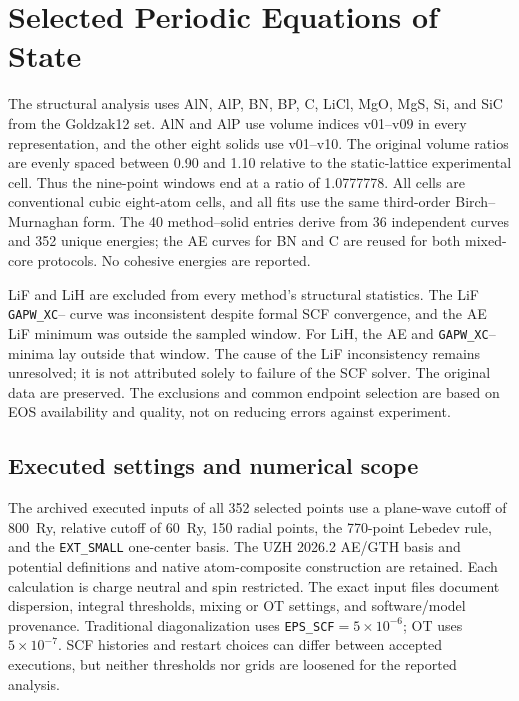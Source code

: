 \section{Selected Periodic Equations of State}

The structural analysis uses AlN, AlP, BN, BP, C, LiCl, MgO, MgS, Si, and SiC from the Goldzak12 set.\cite{Goldzak2022Solids} AlN and AlP use volume indices v01--v09 in every representation, and the other eight solids use v01--v10. The original volume ratios are evenly spaced between 0.90 and 1.10 relative to the static-lattice experimental cell. Thus the nine-point windows end at a ratio of 1.0777778. All cells are conventional cubic eight-atom cells, and all fits use the same third-order Birch--Murnaghan form. The 40 method--solid entries derive from 36 independent curves and 352 unique energies; the AE curves for BN and C are reused for both mixed-core protocols. No cohesive energies are reported.

LiF and LiH are excluded from every method's structural statistics. The LiF \texttt{GAPW\_XC}--\GTH{} curve was inconsistent despite formal SCF convergence, and the AE LiF minimum was outside the sampled window. For LiH, the AE and \texttt{GAPW\_XC}--\GTH{} minima lay outside that window. The cause of the LiF inconsistency remains unresolved; it is not attributed solely to failure of the SCF solver. The original data are preserved. The exclusions and common endpoint selection are based on EOS availability and quality, not on reducing errors against experiment.

\subsection{Executed settings and numerical scope}

The archived executed inputs of all 352 selected points use a plane-wave cutoff of 800~Ry, relative cutoff of 60~Ry, 150 radial points, the 770-point Lebedev rule, and the \texttt{EXT\_SMALL} one-center basis. The UZH 2026.2 AE/GTH basis and potential definitions and native atom-composite construction are retained. Each calculation is charge neutral and spin restricted. The exact input files document dispersion, integral thresholds, mixing or OT settings, and software/model provenance. Traditional diagonalization uses \texttt{EPS\_SCF}$=5\times10^{-6}$; OT uses $5\times10^{-7}$. SCF histories and restart choices can differ between accepted executions, but neither thresholds nor grids are loosened for the reported analysis.


